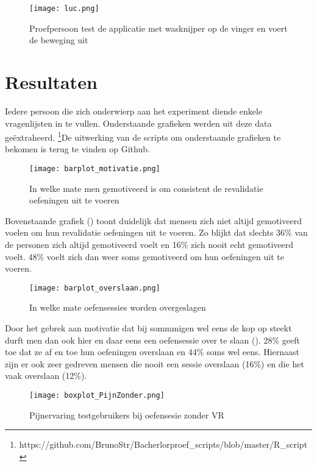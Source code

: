 \begin{figure}[h]
    \centering
    \texttt{[image: luc.png]}
    \caption{Proefpersoon test de applicatie met wasknijper op de vinger en voert de beweging uit}
    \label{figuur 6.2}
\end{figure}

\newpage

\section{Resultaten}
Iedere persoon die zich onderwierp aan het experiment diende enkele vragenlijsten in te vullen. Onderstaande grafieken werden uit deze data geëxtraheerd.
\footnote{https://github.com/BrunoStr/Bacherlorproef\_scripts/blob/master/R\_script}De uitwerking van de scripts om onderstaande grafieken te bekomen is terug te vinden op Github.

\begin{figure}[h]
    \centering
    \texttt{[image: barplot\_motivatie.png]}
    \caption{In welke mate men gemotiveerd is om consistent de revalidatie oefeningen uit te voeren}
    \label{figuur 6.3}
\end{figure}

Bovenstaande grafiek (\cite{figuur 6.3}) toont duidelijk dat mensen zich niet altijd gemotiveerd voelen om hun revalidatie oefeningen uit te voeren. Zo blijkt dat slechts 36\% van de personen zich altijd gemotiveerd voelt en 16\% zich nooit echt gemotiveerd voelt. 48\% voelt zich dan weer soms gemotiveerd om hun oefeningen uit te voeren.

\begin{figure}[h]
    \centering
    \texttt{[image: barplot\_overslaan.png]}
    \caption{In welke mate oefensessies worden overgeslagen}
    \label{figuur 6.4}
\end{figure}

Door het gebrek aan motivatie dat bij sommmigen wel eens de kop op steekt durft men dan ook hier en daar eens een oefensessie over te slaan (\cite{figuur 6.4}). 28\% geeft toe dat ze af en toe hun oefeningen overslaan en 44\% soms wel eens. Hiernaast zijn er ook zeer gedreven mensen die nooit een sessie overslaan (16\%) en die het vaak overslaan (12\%).

\begin{figure}[h]
    \centering
    \texttt{[image: boxplot\_PijnZonder.png]}
    \caption{Pijnervaring testgebruikers bij oefensesie zonder VR}
    \label{figuur 6.5}
\end{figure}

